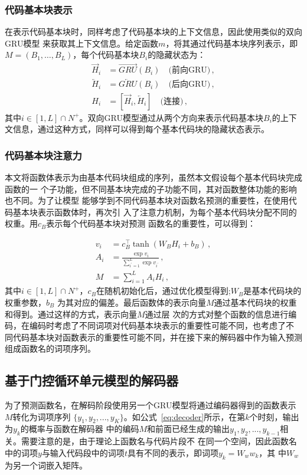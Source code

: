 \subsubsection{代码基本块表示}
在表示代码基本块时，同样考虑了代码基本块的上下文信息，因此使用类似的双向GRU模型
来获取其上下文信息。给定函数$m$，将其通过代码基本块序列表示，即$M = (B_1, \dots,
B_L)$，每个代码基本块$B_i$的隐藏状态为：
\begin{align}
    \overrightarrow{H}_i &= \overrightarrow{GRU}(B_{i}) 
\quad\text{(前向GRU)} \,, \\
    \overleftarrow{H}_i &= \overleftarrow{GRU}(B_i) 
\quad\text{(后向GRU)} \,, \\
    H_i &= [\overrightarrow{H}_i, \overleftarrow{H}_i] 
\quad\text{(连接)} \,,
\end{align}
\label{eq:block_encoder}
其中$i\in [1, L] \cap N^+$。双向GRU模型通过从两个方向来表示代码基本块$B_i$的上下
文信息，通过这种方式，同样可以得到每个基本代码块的隐藏状态表示。

\subsubsection{代码基本块注意力}
本文将函数体表示为由基本代码块组成的序列，虽然本文假设每个基本代码块完成函数的一
个子功能，但不同基本块完成的子功能不同，其对函数整体功能的影响也不同。为了让模型
能够学到不同代码基本块对函数名预测的重要性，在使用代码基本块表示函数体时，再次引
入了注意力机制，为每个基本代码块分配不同的权重。用$c_B$表示每个代码基本块对预测
函数名的重要性，可以得到：

\begin{align}
v_i &= c_B^\top \tanh(W_B H_i + b_B) \,, \\
A_i &= \frac{\exp{v_i}}{\sum_{i^\prime=1}^{L} \exp{v_{i^\prime}}} 
\,, \\
M &= \sum_{i=1}^{L} A_i H_i \,,
\end{align}
\label{eq:block_attn}
其中$i\in [1, L] \cap N^+$，$c_B$在随机初始化后，通过优化模型得到;$W_B$是基本代码块的权重参数，$b_B$
为其对应的偏差。最后函数体的表示向量$M$通过基本代码块的权重和得到。通过这样的方式，表示向量$M$通过层
次的方式对整个函数的信息进行编码，在编码时考虑了不同词项对代码基本块表示的重要性可能不同，也考虑了不
同代码基本块对函数表示的重要性可能不同，并在接下来的解码器中作为输入预测组成函数名的词项序列。

\subsection{基于门控循环单元模型的解码器}
为了预测函数名，在解码阶段使用另一个GRU模型将通过编码器得到的函数表示$M$转化为词项序列
$\{y_1,y_2,...,y_K\}$。如公式~\eqref{eq:decoder}所示，在第$k$个时刻，输出为$y_k$的概率与函数在解码器
中的编码$M$和前面已经生成的输出$y_1,y_2,...,y_{k-1}$相关。需要注意的是，由于理论上函数名与代码片段不
在同一个空间，因此函数名中的词项$y$与输入代码段中的词项$t$具有不同的表示，即词项$y_k = W_w w_k$，其
中$W_w$为另一个词嵌入矩阵。


